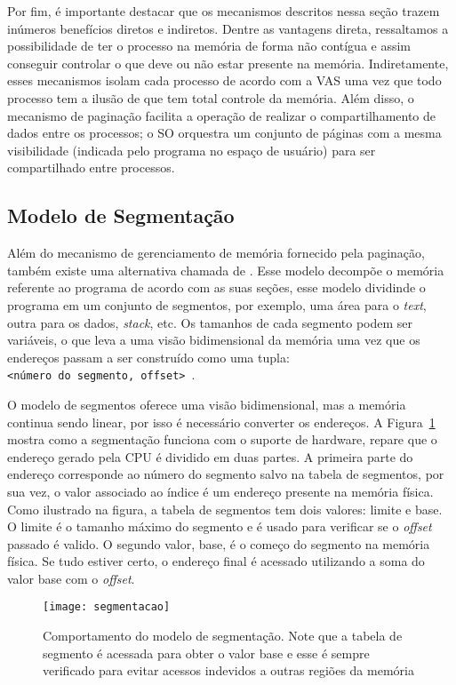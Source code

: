 Por fim, é importante destacar que os mecanismos descritos nessa seção trazem
inúmeros benefícios diretos e indiretos. Dentre as vantagens direta,
ressaltamos a possibilidade de ter o processo na memória de forma não contígua e
assim conseguir controlar o que deve ou não estar presente na memória.
Indiretamente, esses mecanismos isolam cada processo de acordo com a VAS uma
vez que todo processo tem a ilusão de que tem total controle da memória. Além
disso, o mecanismo de paginação facilita a operação de realizar o
compartilhamento de dados entre os processos; o SO orquestra um conjunto de
páginas com a mesma visibilidade (indicada pelo programa no espaço de usuário)
para ser compartilhado entre processos.

\subsection{Modelo de Segmentação}

Além do mecanismo de gerenciamento de memória fornecido pela paginação, também
existe uma alternativa chamada de . Esse modelo
decompõe o memória referente ao programa de acordo com as suas seções,
esse modelo dividinde o programa em um conjunto de segmentos, por exemplo, uma
área para o \textit{text}, outra para os dados, \textit{stack}, etc. Os
tamanhos de cada segmento podem ser variáveis, o que leva a uma visão
bidimensional da memória uma vez que os endereços passam a ser construído como
uma tupla: \\

\texttt{<número do segmento, offset>}~\citep{silberschatz}.

O modelo de segmentos oferece uma visão bidimensional, mas a memória continua
sendo linear, por isso é necessário converter os endereços.
A Figura~\ref{fig:segmentacao} mostra como a segmentação funciona com o suporte de hardware, repare
que o endereço gerado pela CPU é dividido em duas partes. A primeira parte do
endereço corresponde ao número do segmento salvo na tabela de segmentos, por
sua vez, o valor associado ao índice é um endereço presente na memória física.
Como ilustrado na figura, a tabela de segmentos tem dois valores: limite e
base. O limite é o tamanho máximo do segmento e é usado para verificar se o
\emph{offset} passado é valido. O segundo valor, base, é o começo do segmento na
memória física. Se tudo estiver certo, o endereço final é acessado utilizando a
soma do valor base com o \emph{offset}.

\begin{figure}[!h]
  \centering
  \texttt{[image: segmentacao]} 
  \caption{Comportamento do modelo de segmentação. Note que a tabela de segmento é acessada para obter o valor base e esse é sempre verificado para evitar acessos indevidos a outras regiões da memória}
  \label{fig:segmentacao} 
\end{figure}


